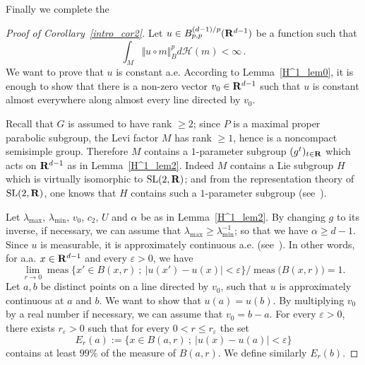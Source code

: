 \documentclass[11pt]{article}
\theoremstyle{definition}
\numberwithin{equation}{section}
\numberwithin{figure}{section}
\numberwithin{table}{section}
\DeclareMathOperator{\maxrm}{max}
\DeclareMathOperator{\minrm}{min}
\DeclareMathOperator{\meas}{meas}
\DeclareMathOperator{\SL}{SL}
\begin{document}
Finally we complete the 
\begin{proof}[Proof of Corollary~\ref{intro_cor2}]
Let $u \in B_{p,p} ^{(d-1)/p} ({\bf R} ^{d-1})$ be a function such that
\[
\int _M \!\Vert u \circ m \Vert _B ^p d\mathcal H (m) < \infty\,. 
\]
We want to prove that $u$ is constant a.e. According to Lemma~\ref{H^1_lem0}, it is enough to show that there is a non-zero vector $v_0 \in {\bf R}^{d-1}$ such that $u$ is constant almost everywhere along almost every line directed by $v_0$.

Recall that $G$ is assumed to have rank $\geqslant 2$; since $P$ is a maximal proper parabolic subgroup, the Levi factor $M$ has rank $\geqslant 1$, hence is a noncompact semisimple group. Therefore $M$ contains a $1$-parameter subgroup $(g^t)_{t \in {\bf R}}$ which acts on ${\bf R} ^{d-1}$ as in Lemma~\ref{H^1_lem2}. Indeed $M$ contains a Lie subgroup $H$ which is virtually isomorphic to $\SL(2, \bf R)$; and from the representation theory of $\SL(2, \bf R)$, one knows that $H$ contains such a $1$-parameter subgroup (see~\cite[Corollary~7.2]{Humphreys-LA}).

Let $\lambda _{\maxrm}$, $\lambda _{\minrm}$, $v_0$, $c_2$, $U$ and $\alpha$ be as in Lemma~\ref{H^1_lem2}. By changing $g$ to its inverse, if necessary, we can assume that $\lambda _{\maxrm} \geqslant \lambda _{\minrm}^{-1}$; so that we have $\alpha \geqslant d-1$. Since $u$ is measurable, it is approximately continuous a.e. (see~\cite[2.9.13]{Fed}). In other words, for a.a. $x \in {\bf R} ^{d-1}$ and every $\varepsilon >0$, we have
\[
\lim _{r \to 0} \meas\bigl\{x' \in B(x,r)~;~\vert u(x') - u(x) \vert < \varepsilon \bigr\} \big/ \meas\bigl(B(x,r)\bigr) =1.
\]
Let $a, b$ be distinct points on a line directed by $v_0$, such that $u$ is approximately continuous at $a$ and $b$. We want to show that $u(a) = u(b)$. By multiplying $v_0$ by a real number if necessary, we can assume that $v_0 = b-a$. For every $\varepsilon > 0$, there exists $r_\varepsilon >0$ such that for every $0<r \leqslant r_\varepsilon$ the set
\[
E_r (a) := \bigl\{x \in B(a,r)~;~\vert u(x) - u(a) \vert < \varepsilon \bigr\}
\]
contains at least $99 \%$ of the measure of $B(a,r)$.
We define similarly $E_r (b)$.


\end{proof}
\end{document}
